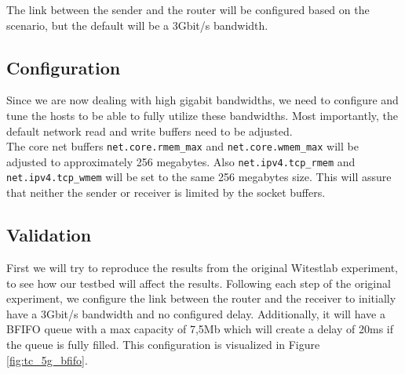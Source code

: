 \documentclass[a4paper,english, 11pt]{report}
\begin{document}
The link between the sender and the router will be configured based on the scenario, but the default will be a 3Gbit/s bandwidth.

\subsection{Configuration}
Since we are now dealing with high gigabit bandwidths, we need to configure and tune the hosts to be able to fully utilize these bandwidths. Most importantly, the default network read and write buffers need to be adjusted.\\

The core net buffers \verb|net.core.rmem_max| and \verb|net.core.wmem_max| will be adjusted to approximately 256 megabytes. Also \verb|net.ipv4.tcp_rmem| and \verb|net.ipv4.tcp_wmem| will be set to the same 256 megabytes size. This will assure that neither the sender or receiver is limited by the socket buffers.

\subsection{Validation}

First we will try to reproduce the results from the original Witestlab experiment, to see how our testbed will affect the results.
Following each step of the original experiment, we configure the link between the router and the receiver to initially have a 3Gbit/s bandwidth and no configured delay. Additionally, it will have a BFIFO queue with a max capacity of 7,5Mb which will create a delay of 20ms if the queue is fully filled. This configuration is visualized in Figure \ref{fig:tc_5g_bfifo}. \\
\end{document}
